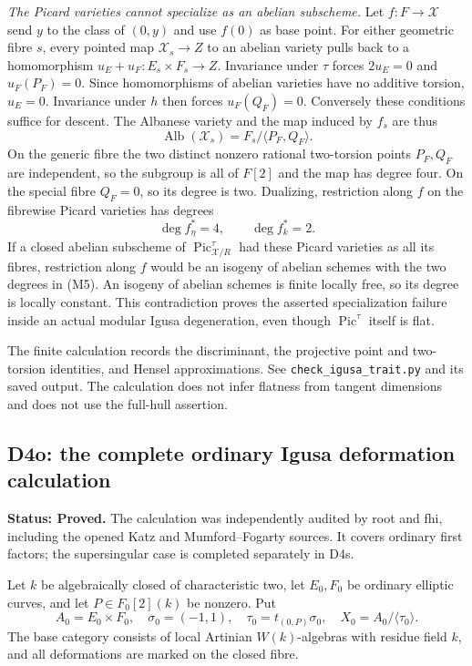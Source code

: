 \emph{The Picard varieties cannot specialize as an abelian subscheme.}
Let $f:F\to\mathcal X$ send $y$ to the class of $(0,y)$ and use
$f(0)$ as base point. For either geometric fibre $s$, every pointed
map $\mathcal X_s\to Z$ to an abelian variety pulls back to a
homomorphism $u_E+u_F:E_s\times F_s\to Z$. Invariance under $\tau$
forces $2u_E=0$ and $u_F(P_F)=0$. Since homomorphisms of abelian
varieties have no additive torsion, $u_E=0$. Invariance under $h$
then forces $u_F(Q_F)=0$. Conversely these conditions suffice for
descent. The Albanese variety and the map induced by $f_s$ are thus
\[
 \operatorname{Alb}(\mathcal X_s)=
 F_s/\langle P_F,Q_F\rangle.
\]
On the generic fibre the two distinct nonzero rational two-torsion
points $P_F,Q_F$ are independent, so the subgroup is all of $F[2]$
and the map has degree four. On the special fibre $Q_F=0$, so its
degree is two. Dualizing, restriction along $f$ on the fibrewise
Picard varieties has degrees
\[
 \deg f_\eta^*=4,\qquad \deg f_k^*=2.                    \tag{M5}
\]
If a closed abelian subscheme of
$\operatorname{Pic}^{\tau}_{\mathcal X/R}$ had these Picard varieties
as all its fibres, restriction along $f$ would be an isogeny of
abelian schemes with the two degrees in (M5). An isogeny of abelian
schemes is finite locally free, so its degree is locally constant.
This contradiction proves the asserted specialization failure
inside an actual modular Igusa degeneration, even though
$\operatorname{Pic}^{\tau}$ itself is flat.

The finite calculation records the discriminant, the projective
point and two-torsion identities, and Hensel approximations. See
\texttt{check\_igusa\_trait.py} and its saved output. The calculation
does not infer flatness from tangent dimensions and does not use
the full-hull assertion.


\subsection*{D4o: the complete ordinary Igusa deformation calculation}
\textbf{Status: Proved.} The calculation was independently audited by root and fhi, including the opened Katz and Mumford--Fogarty sources. It covers ordinary first factors; the supersingular case is completed separately in D4s.

Let $k$ be algebraically closed of characteristic two, let $E_0,F_0$ be ordinary
elliptic curves, and let $P\in F_0[2](k)$ be nonzero. Put
\[
 A_0=E_0\times F_0,\quad \sigma_0=(-1,1),\quad
 \tau_0=t_{(0,P)}\sigma_0,\quad X_0=A_0/\langle\tau_0\rangle.
\]
The base category consists of local Artinian $W(k)$-algebras with residue
field $k$, and all deformations are marked on the closed fibre.

